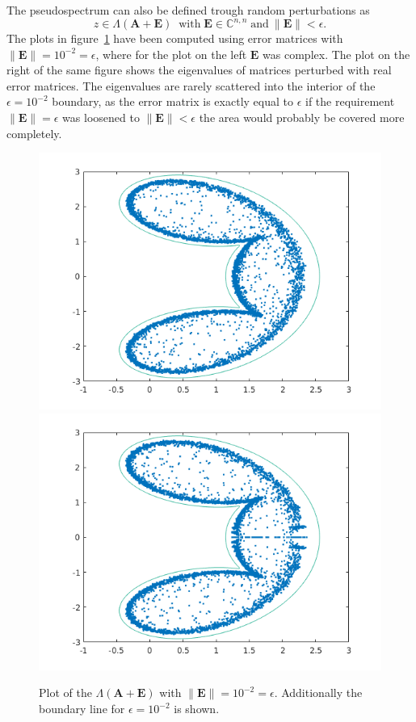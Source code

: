 The pseudospectrum can also be defined trough random perturbations as
\begin{equation}
 z \in \Lambda(\mathbf{A} + \mathbf{E}) \;\; \text{with} \; \mathbf{E} \in \mathbb{C}^{n,n} \; \text{and} \: \|\mathbf{E}\| < \epsilon.
\end{equation}
The plots in figure~\ref{fig:randPerts} have been computed using error matrices with $\|\mathbf{E}\| = 10^{-2} = \epsilon$, where for the plot on the left $\mathbf{E}$ was complex. The plot on the right of the same figure shows the eigenvalues of matrices perturbed with real error matrices. The eigenvalues are rarely scattered into the interior of the $ \epsilon = 10^{-2}$ boundary, as the error matrix is exactly equal to $\epsilon$ if the requirement $\| \mathbf{E} \| = \epsilon$ was loosened to $\| \mathbf{E} \| < \epsilon$ the area would probably be covered more completely.
\begin{figure}
\includegraphics[width=0.5\linewidth]{../src/figures/randPert}
\includegraphics[width=0.5\linewidth]{../src/figures/randPertReal}
\caption{Plot of the $\Lambda(\mathbf{A} + \mathbf{E})$ with $\|\mathbf{E}\| = 10^{-2} = \epsilon$. Additionally the boundary line for $\epsilon = 10^{-2}$ is shown. }
\label{fig:randPerts}
\end{figure}
